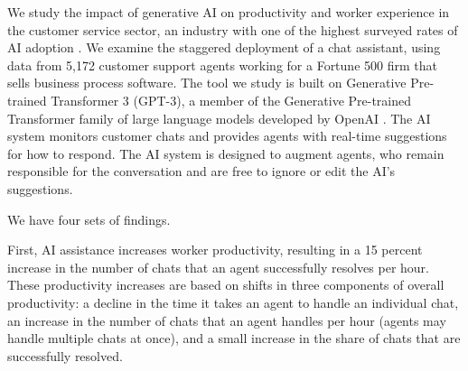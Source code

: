 \documentclass[11pt]{article}
\begin{document}



We study the impact of generative AI on productivity and worker experience in the customer service sector, an industry with one of the highest surveyed rates of AI adoption \citep{chui_global_2021}. We examine the staggered deployment of a chat assistant, using data from 5,172 customer support agents working for a Fortune 500 firm that sells business process software. The tool we study is built on Generative Pre-trained Transformer 3 (GPT-3), a member of the Generative Pre-trained Transformer family of large language models developed by OpenAI \citep{GPT4TechnicalReport2023}.  The AI system monitors customer chats and provides agents with real-time suggestions for how to respond. The AI system is designed to augment agents, who remain responsible for the conversation and are free to ignore or edit the AI's suggestions.

We have four sets of findings.  

First, AI assistance increases worker productivity, resulting in a 15 percent increase in the number of chats that an agent successfully resolves per hour. These productivity increases are based on shifts in three components of overall productivity: a decline in the time it takes an agent to handle an individual chat, an increase in the number of chats that an agent handles per hour (agents may handle multiple chats at once), and a small increase in the share of chats that are successfully resolved.  
\end{document}
